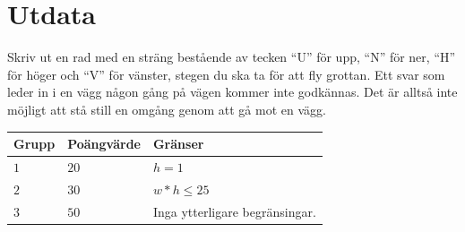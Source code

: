 \section*{Utdata}
Skriv ut en rad med en sträng bestående av tecken ``U'' för upp, ``N'' för ner, ``H'' för höger och ``V'' för vänster,
stegen du ska ta för att fly grottan. Ett svar som leder in i en vägg någon gång på vägen kommer inte godkännas.
Det är alltså inte möjligt att stå still en omgång genom att gå mot en vägg.

\noindent
\begin{tabular}{| l | l | p{12cm} |}
  \hline
  Grupp & Poängvärde & Gränser \\ \hline
  $1$    & $20$        & $h=1$ \\ \hline 
  $2$    & $30$        & $w*h \leq 25$ \\ \hline 
  $3$    & $50$        & Inga ytterligare begränsingar. \\ \hline 
\end{tabular}
